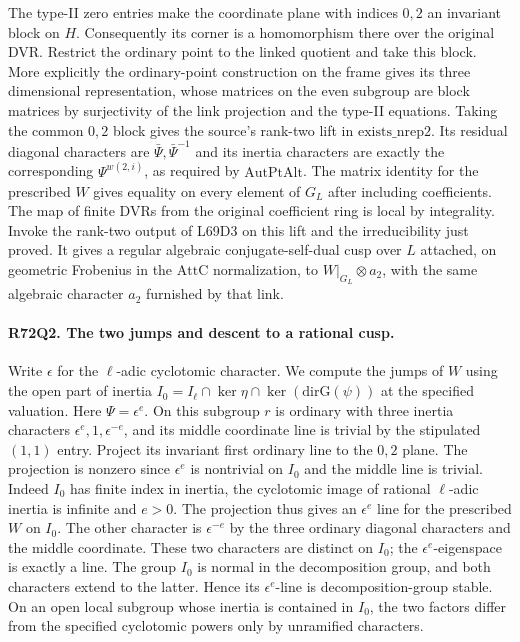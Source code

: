 The type-II zero entries make the coordinate plane with indices
$0,2$ an invariant block on $H$. Consequently its corner is a
homomorphism there over the original DVR. Restrict the ordinary
point to the linked quotient and take this block. More explicitly
the ordinary-point construction on the frame gives its three
dimensional representation, whose matrices on the even subgroup
are block matrices by surjectivity of the link projection and
the type-II equations. Taking the common $0,2$ block gives the
source's rank-two lift in $\mathrm{exists\_nrep2}$. Its residual
diagonal characters are $\bar\Psi,\bar\Psi^{-1}$ and its inertia
characters are exactly the corresponding $\Psi^{w(2,i)}$, as
required by $\mathrm{AutPtAlt}$. The matrix identity for the
prescribed $W$ gives equality on every element of $G_L$ after
including coefficients. The map of finite DVRs from the original
coefficient ring is local by integrality. Invoke the rank-two
output of L69D3 on this lift and the irreducibility just proved.
It gives a regular algebraic conjugate-self-dual cusp over $L$
attached, on geometric Frobenius in the $\mathrm{AttC}$
normalization, to $W|_{G_L}\otimes a_2$, with the same algebraic
character $a_2$ furnished by that link.

\paragraph{R72Q2. The two jumps and descent to a rational cusp.}
Write $\epsilon$ for the $\ell$-adic cyclotomic character. We
compute the jumps of $W$ using the open part of inertia
$I_0=I_\ell\cap\ker\eta\cap\ker(\mathrm{dirG}(\psi))$ at the
specified valuation. Here $\Psi=\epsilon^e$. On this subgroup
$r$ is ordinary with three inertia characters
$\epsilon^e,1,\epsilon^{-e}$, and its middle coordinate line
is trivial by the stipulated $(1,1)$ entry. Project its invariant
first ordinary line to the $0,2$ plane. The projection is nonzero
since $\epsilon^e$ is nontrivial on $I_0$ and the middle line is
trivial. Indeed $I_0$ has finite index in inertia, the cyclotomic
image of rational $\ell$-adic inertia is infinite and $e>0$.
The projection thus gives an $\epsilon^e$ line for the prescribed
$W$ on $I_0$. The other character is $\epsilon^{-e}$ by the
three ordinary diagonal characters and the middle coordinate.
These two characters are distinct on $I_0$; the
$\epsilon^e$-eigenspace is exactly a line. The group $I_0$ is
normal in the decomposition group, and both characters extend
to the latter. Hence its $\epsilon^e$-line is decomposition-group
stable. On an open local subgroup whose inertia is contained
in $I_0$, the two factors differ from the specified cyclotomic
powers only by unramified characters.

